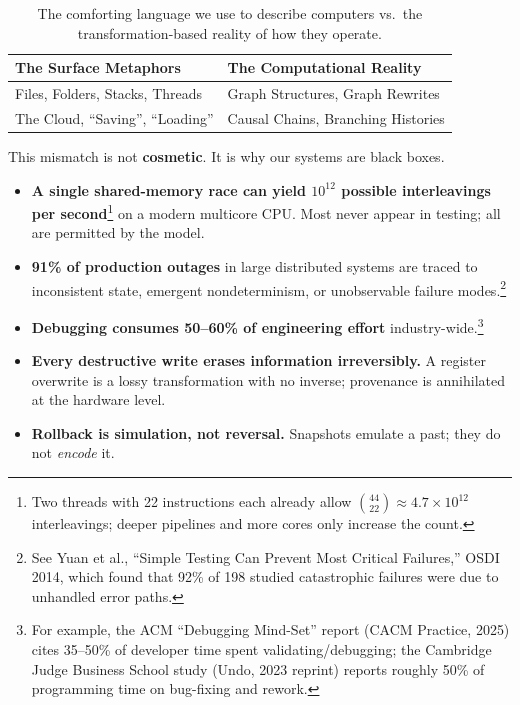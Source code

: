 \begin{table}[h]
\centering
\begin{tabular}{|l|l|}
\hline
\textbf{The Surface Metaphors} & \textbf{The Computational Reality} \\
\hline
Files, Folders, Stacks, Threads & Graph Structures, Graph Rewrites \\
The Cloud, ``Saving'', ``Loading'' & Causal Chains, Branching Histories \\
\hline
\end{tabular}
\caption{The comforting language we use to describe computers vs.\ the transformation-based reality of how they operate.}
\label{tab:surface_vs_reality}
\end{table}

This mismatch is not \textbf{cosmetic}. It is why our systems are black boxes.

\begin{itemize}
    \item \textbf{A single shared-memory race can yield $10^{12}$ possible interleavings per second}\footnote{Two threads with 22 instructions each already allow $\binom{44}{22} \approx 4.7\times10^{12}$ interleavings; deeper pipelines and more cores only increase the count.} on a modern multicore CPU. Most never appear in testing; all are permitted by the model.
    \item \textbf{91\% of production outages} in large distributed systems are traced to inconsistent state, emergent nondeterminism, or unobservable failure modes.\footnote{See Yuan et al., “Simple Testing Can Prevent Most Critical Failures,” OSDI 2014, which found that 92\% of 198 studied catastrophic failures were due to unhandled error paths.}
    \item \textbf{Debugging consumes 50--60\% of engineering effort} industry-wide.\footnote{For example, the ACM “Debugging Mind-Set” report (CACM Practice, 2025) cites 35--50\% of developer time spent validating/debugging; the Cambridge Judge Business School study (Undo, 2023 reprint) reports roughly 50\% of programming time on bug-fixing and rework.}
    \item \textbf{Every destructive write erases information irreversibly.} A register overwrite is a lossy transformation with no inverse; provenance is annihilated at the hardware level.
    \item \textbf{Rollback is simulation, not reversal.} Snapshots emulate a past; they do not \emph{encode} it.
\end{itemize}

